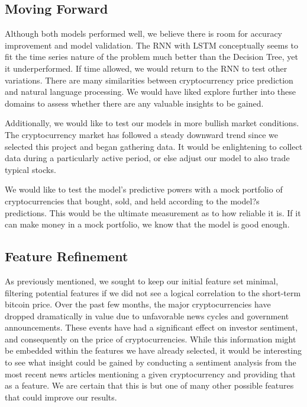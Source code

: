 \documentclass{article}
\begin{document}
\subsection{ Moving Forward }
Although both models performed well, we believe there is room for accuracy improvement and model validation. The RNN with LSTM conceptually seems to fit the time series nature of the problem much better than the Decision Tree, yet it underperformed. If time allowed, we would return to the RNN to test other variations. There are many similarities between cryptocurrency price prediction and natural language processing. We would have liked explore further into these domains to assess whether there are any valuable insights to be gained.

Additionally, we would like to test our models in more bullish market conditions. The cryptocurrency market has followed a steady downward trend since we selected this project and began gathering data. It would be enlightening to collect data during a particularly active period, or else adjust our model to also trade typical stocks.

We would like to test the model's predictive powers with a mock portfolio of cryptocurrencies that bought, sold, and held according to the model?s predictions. This would be the ultimate measurement as to how reliable it is. If it can make money in a mock portfolio, we know that the model is good enough.

\subsection{ Feature Refinement }
As previously mentioned, we sought to keep our initial feature set minimal, filtering potential features if we did not see a logical correlation to the short-term bitcoin price. Over the past few months, the major cryptocurrencies have dropped dramatically in value due to unfavorable news cycles and government announcements. These events have had a significant effect on investor sentiment, and consequently on the price of cryptocurrencies. While this information might be embedded within the features we have already selected, it would be interesting to see what insight could be gained by conducting a sentiment analysis from the most recent news articles mentioning a given cryptocurrency and providing that as a feature. We are certain that this is but one of many other possible features that could improve our results.
\end{document}
